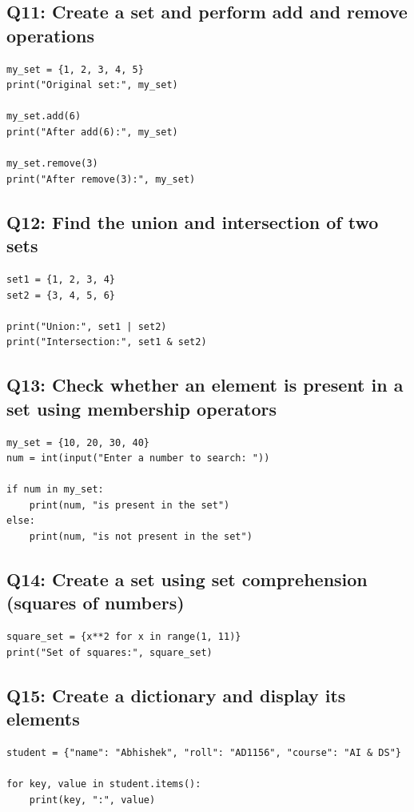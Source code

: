 \documentclass[11pt,a4paper]{article}
\begin{document}
\subsection{Q11: Create a set and perform add and remove operations}
\begin{lstlisting}
my_set = {1, 2, 3, 4, 5}
print("Original set:", my_set)

my_set.add(6)
print("After add(6):", my_set)

my_set.remove(3)
print("After remove(3):", my_set)
\end{lstlisting}

\subsection{Q12: Find the union and intersection of two sets}
\begin{lstlisting}
set1 = {1, 2, 3, 4}
set2 = {3, 4, 5, 6}

print("Union:", set1 | set2)
print("Intersection:", set1 & set2)
\end{lstlisting}

\subsection{Q13: Check whether an element is present in a set using membership operators}
\begin{lstlisting}
my_set = {10, 20, 30, 40}
num = int(input("Enter a number to search: "))

if num in my_set:
    print(num, "is present in the set")
else:
    print(num, "is not present in the set")
\end{lstlisting}

\subsection{Q14: Create a set using set comprehension (squares of numbers)}
\begin{lstlisting}
square_set = {x**2 for x in range(1, 11)}
print("Set of squares:", square_set)
\end{lstlisting}

\subsection{Q15: Create a dictionary and display its elements}
\begin{lstlisting}
student = {"name": "Abhishek", "roll": "AD1156", "course": "AI & DS"}

for key, value in student.items():
    print(key, ":", value)
\end{lstlisting}
\end{document}

